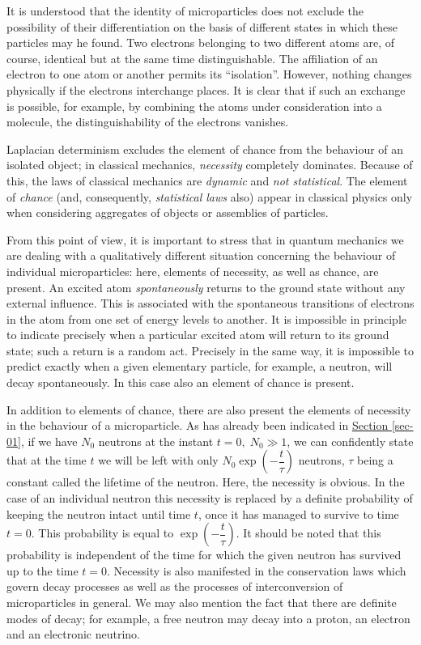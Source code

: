 \documentclass[a4paper,sfsidenotes,colorlinks=true]{tufte-book}
\numberwithin{equation}{section}
\numberwithin{figure}{section}
\begin{document}
It is understood that the identity of microparticles does not exclude the possibility of their differentiation on the basis of different states in which these particles may he found. Two electrons belonging to two different atoms are, of course, identical but at the same time distinguishable. The affiliation of an electron to one atom or another permits its ``isolation''. However, nothing changes physically if the electrons interchange places. It is clear that if such an exchange is possible, for example, by combining the atoms under consideration into a molecule, the distinguishability of the electrons vanishes.


Laplacian determinism excludes the element of chance from the
behaviour of an isolated object; in classical mechanics,
\emph{necessity} completely dominates. Because of this, the laws of
classical mechanics are \emph{dynamic} and \emph{not statistical}. The
element of \emph{chance} (and, consequently, \emph{statistical laws}
also) appear in classical physics only when considering aggregates of
objects or assemblies of particles.


From this point of view, it is important to stress that in quantum
mechanics we are dealing with a qualitatively different situation
concerning the behaviour of individual microparticles: here, elements
of necessity, as well as chance, are present. An excited atom
\emph{spontaneously} returns to the ground state without any external
influence. This is associated with the spontaneous transitions of
electrons in the atom from one set of energy levels to another. It is
impossible in principle to indicate precisely when a particular
excited atom will return to its ground state; such a return is a
random act. Precisely in the same way, it is impossible to predict
exactly when a given elementary particle, for example, a neutron, will
decay spontaneously. In this case also an element of chance is
present.


In addition to elements of chance, there are also present the elements
of necessity in the behaviour of a microparticle. As has already been
indicated in \hyperref[sec-01]{Section \ref{sec-01}}, if we have
$N_{0}$ neutrons at the instant $t=0, \; N_{0} \gg 1$, we can confidently
state that at the time $t$ we will be left with only $N_{0} \exp
\left( - \dfrac{t}{\tau} \right)$ neutrons, $\tau$ being a constant called the
lifetime of the neutron. Here, the necessity is obvious. In the case
of an individual neutron this necessity is replaced by a definite
probability of keeping the neutron intact until time $t$, once it has
managed to survive to time $t = 0$. This probability is equal to $
\exp \left( - \dfrac{t}{\tau} \right)$. It should be noted that this probability is
independent of the time for which the given neutron has survived up to
the time $t =0$. Necessity is also manifested in the conservation laws
which govern decay processes as well as the processes of
interconversion of microparticles in general. We may also mention the
fact that there are definite modes of decay; for example, a free
neutron may decay into a proton, an electron and an electronic
neutrino.
\end{document}
